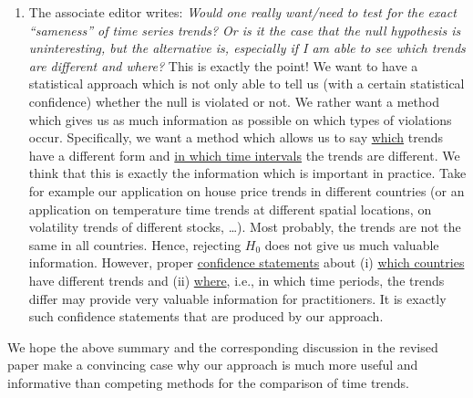\documentclass[a4paper,12pt]{article}
\begin{document}
\begin{enumerate}[label=\arabic*.,leftmargin=0.6cm]
\begin{enumerate}[leftmargin=0.7cm]
\item The associate editor writes: \textit{Would one really want/need to test for the exact ``sameness'' of time series trends? Or is it the case that the null hypothesis is uninteresting, but the alternative is, especially if I am able to see which trends are different and where?} This is exactly the point!
We want to have a statistical approach which is not only able to tell us (with a certain statistical confidence) whether the null is violated or not. We rather want a method which gives us as much information as possible on which types of violations occur. Specifically, we want a method which allows us to say \underline{which} trends have a different form and \underline{in which time intervals} the trends are different. We think that this is exactly the information which is important in practice. Take for example our application on house price trends in different countries (or an application on temperature time trends at different spatial locations, on volatility trends of different stocks, \ldots).  Most probably, the trends are not the same in all countries.
Hence, rejecting $H_0$ does not give us much valuable information. However, proper \underline{confidence statements} about (i) \underline{which countries} have different trends and (ii) \underline{where}, i.e., in which time periods, the trends differ may provide very valuable information for practitioners. It is exactly such confidence statements that are produced by our approach. 

\end{enumerate}  
We hope the above summary and the corresponding discussion in the revised paper make a convincing case why our approach is much more useful and informative than competing methods for the comparison of time trends. 

\end{enumerate}
\end{document}

